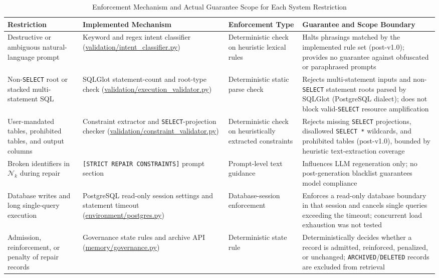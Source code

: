 \begin{table}[t]
\centering
\caption{Enforcement Mechanism and Actual Guarantee Scope for Each System Restriction}
\label{tab:enforcement}
\footnotesize
\setlength{\tabcolsep}{4pt}
\renewcommand{\arraystretch}{1.05}
\begin{tabularx}{\textwidth}{@{}>{\raggedright\arraybackslash}p{3.1cm} >{\raggedright\arraybackslash}p{3.9cm} >{\raggedright\arraybackslash}p{2.8cm} >{\raggedright\arraybackslash}X@{}}
\toprule
\textbf{Restriction} & \textbf{Implemented Mechanism} & \textbf{Enforcement Type} & \textbf{Guarantee and Scope Boundary} \\
\midrule
Destructive or ambiguous natural-language prompt & Keyword and regex intent classifier (\url{validation/intent_classifier.py}) & Deterministic check on heuristic lexical rules & Halts phrasings matched by the implemented rule set (post-v1.0); provides no guarantee against obfuscated or paraphrased prompts \\
Non-\texttt{SELECT} root or stacked multi-statement SQL & SQLGlot statement-count and root-type check (\url{validation/execution_validator.py}) & Deterministic static parse check & Rejects multi-statement inputs and non-\texttt{SELECT} statement roots parsed by SQLGlot (PostgreSQL dialect); does not block valid-\texttt{SELECT} resource amplification \\
User-mandated tables, prohibited tables, and output columns & Constraint extractor and \texttt{SELECT}-projection checker (\url{validation/constraint_validator.py}) & Deterministic check on heuristically extracted constraints & Rejects missing \texttt{SELECT} projections, disallowed \texttt{SELECT *} wildcards, and prohibited tables (post-v1.0), bounded by heuristic text-extraction coverage \\
Broken identifiers in $\mathcal{N}_k$ during repair & \texttt{[STRICT REPAIR CONSTRAINTS]} prompt section & Prompt-level text guidance & Influences LLM regeneration only; no post-generation blacklist guarantees model compliance \\
Database writes and long single-query execution & PostgreSQL read-only session settings and statement timeout (\url{environment/postgres.py}) & Database-session enforcement & Enforces a read-only database boundary in that session and cancels single queries exceeding the timeout; concurrent load exhaustion was not tested \\
Admission, reinforcement, or penalty of repair records & Governance state rules and archive API (\url{memory/governance.py}) & Deterministic state rule & Deterministically decides whether a record is admitted, reinforced, penalized, or unchanged; \texttt{ARCHIVED}/\texttt{DELETED} records are excluded from retrieval \\
\bottomrule
\end{tabularx}
\end{table}

